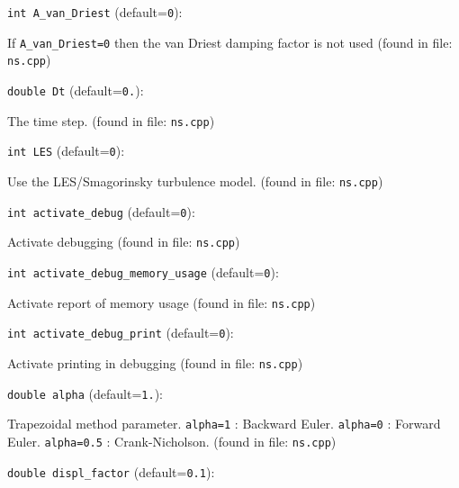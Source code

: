 \item\verb+int A_van_Driest+ {\rm(default=\verb|0|)}:

If {\tt A\_van\_Driest=0} then the van Driest
   damping factor is not used 
 (found in file: \verb+ns.cpp+)
\item\verb+double Dt+ {\rm(default=\verb|0.|)}:

The time step.
 (found in file: \verb+ns.cpp+)
\item\verb+int LES+ {\rm(default=\verb|0|)}:

Use the LES/Smagorinsky turbulence model. 
 (found in file: \verb+ns.cpp+)
\item\verb+int activate_debug+ {\rm(default=\verb|0|)}:

Activate debugging
 (found in file: \verb+ns.cpp+)
\item\verb+int activate_debug_memory_usage+ {\rm(default=\verb|0|)}:

Activate report of memory usage
 (found in file: \verb+ns.cpp+)
\item\verb+int activate_debug_print+ {\rm(default=\verb|0|)}:

Activate printing in debugging
 (found in file: \verb+ns.cpp+)
\item\verb+double alpha+ {\rm(default=\verb|1.|)}:

Trapezoidal method parameter.  \verb+alpha=1+ :
Backward Euler.  \verb+alpha=0+ : Forward Euler.
 \verb+alpha=0.5+ : Crank-Nicholson. 
 (found in file: \verb+ns.cpp+)
\item\verb+double displ_factor+ {\rm(default=\verb|0.1|)}:

